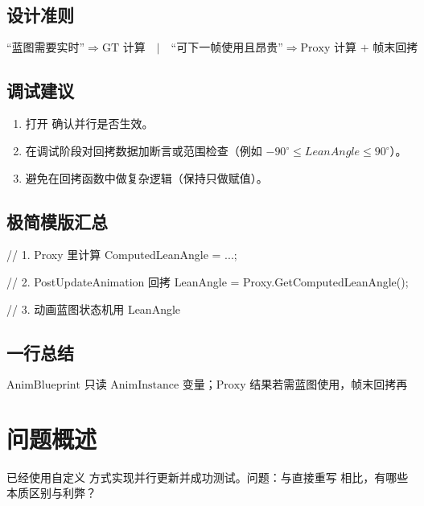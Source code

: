 \documentclass[10pt,openright,oneside,CJKmath]{MyBook}
\begin{document}
\subsection{设计准则}
\[
\text{“蓝图需要实时”} \Rightarrow \text{GT 计算} \quad|\quad
\text{“可下一帧使用且昂贵”} \Rightarrow \text{Proxy 计算 + 帧末回拷}
\]

\subsection{调试建议}
\begin{enumerate}
  \item 打开  确认并行是否生效。
  \item 在调试阶段对回拷数据加断言或范围检查（例如 \(-90^\circ \le LeanAngle \le 90^\circ\)）。
  \item 避免在回拷函数中做复杂逻辑（保持只做赋值）。
\end{enumerate}

\subsection{极简模版汇总}
\begin{code}
// 1. Proxy 里计算
ComputedLeanAngle = ...;

// 2. PostUpdateAnimation 回拷
LeanAngle = Proxy.GetComputedLeanAngle();

// 3. 动画蓝图状态机用 LeanAngle
\end{code}

\subsection{一行总结}
\[
\boxed{\text{AnimBlueprint 只读 AnimInstance 变量；Proxy 结果若需蓝图使用，帧末回拷再生效。}}
\]

\section{问题概述}
已经使用自定义  方式实现并行更新并成功测试。问题：与直接重写  相比，有哪些本质区别与利弊？
\end{document}
